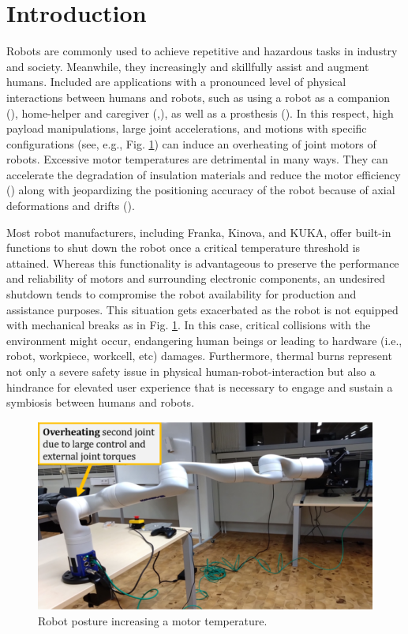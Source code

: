 \documentclass{ifacconf}
\begin{document}
\section{Introduction}
Robots are commonly used to  achieve repetitive and hazardous tasks in industry and society. Meanwhile, they increasingly and skillfully assist and augment humans. Included are  applications with a pronounced level of physical interactions between humans and robots, such as using a robot as a companion (\cite{basha2025robotic}), home-helper and caregiver (\cite{tsui2025exploring},\cite{gkiolnta2025challenges}), as well as a prosthesis (\cite{kim2025mode}). In this respect, high payload manipulations, large joint accelerations, and motions with specific configurations (see, e.g., Fig. \ref{fig:intro}) can induce an overheating of joint motors of robots. Excessive motor temperatures are detrimental in many ways. They can accelerate the degradation of insulation materials and reduce the motor efficiency (\cite{yehorov2025study}) along with jeopardizing the positioning accuracy of the robot because of axial  deformations and drifts (\cite{soga2024skillful}). 



Most robot manufacturers, including Franka, Kinova, and KUKA, offer built-in functions to shut down the robot once a critical temperature threshold is attained. Whereas this functionality is advantageous to preserve the performance and reliability of motors and surrounding electronic components, an undesired shutdown tends to compromise the robot availability for production and assistance purposes. This situation gets exacerbated as the robot is not equipped with mechanical breaks as in Fig. \ref{fig:intro}. In this case, critical collisions with the environment might occur, endangering human beings or leading to hardware (i.e., robot, workpiece, workcell, etc) damages. Furthermore, thermal burns represent  not only  a severe safety issue in physical human-robot-interaction but also a hindrance for elevated user experience that is necessary to engage and sustain a symbiosis between humans and robots.

\begin{figure}[t]
	\centerline{\includegraphics[width=0.9\columnwidth]{pictures/intro_zoomed.png}}
	\caption{Robot posture increasing a motor temperature.}
	\label{fig:intro}
\end{figure}
\end{document}
